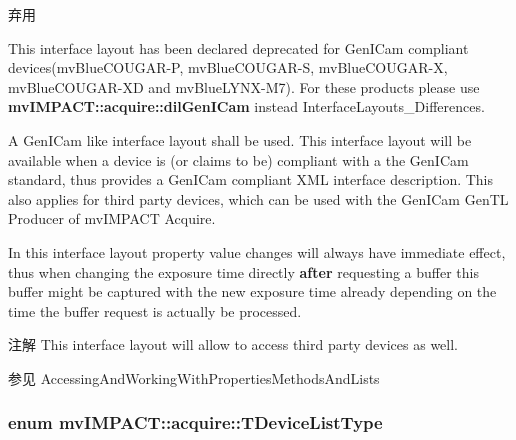 \begin{Desc}
\begin{description}
\begin{DoxyRefDesc}{弃用}
\item[\hyperlink{deprecated__deprecated000004}{弃用}]This interface layout has been declared deprecated for Gen\+I\+Cam compliant devices(mv\+Blue\+C\+O\+U\+G\+A\+R-\/\+P, mv\+Blue\+C\+O\+U\+G\+A\+R-\/\+S, mv\+Blue\+C\+O\+U\+G\+A\+R-\/\+X, mv\+Blue\+C\+O\+U\+G\+A\+R-\/\+X\+D and mv\+Blue\+L\+Y\+N\+X-\/\+M7). For these products please use {\bfseries mv\+I\+M\+P\+A\+C\+T\+::acquire\+::dil\+Gen\+I\+Cam} instead Interface\+Layouts\+\_\+\+Differences. \end{DoxyRefDesc}
\item[{\em 
\hypertarget{group___common_interface_gga8206c9f9a594b7c21b43aaa624a86220ad2eaec878b614e46b3dd5e8cd725f58b}{dil\+Gen\+I\+Cam}\label{group___common_interface_gga8206c9f9a594b7c21b43aaa624a86220ad2eaec878b614e46b3dd5e8cd725f58b}
}]A Gen\+I\+Cam\texttrademark{} like interface layout shall be used. This interface layout will be available when a device is (or claims to be) compliant with a the Gen\+I\+Cam\texttrademark{} standard, thus provides a Gen\+I\+Cam\texttrademark{} compliant X\+M\+L interface description. This also applies for third party devices, which can be used with the Gen\+I\+Cam Gen\+T\+L Producer of mv\+I\+M\+P\+A\+C\+T Acquire.

In this interface layout property value changes will always have immediate effect, thus when changing the exposure time directly {\bfseries after} requesting a buffer this buffer might be captured with the new exposure time already depending on the time the buffer request is actually be processed.

\begin{DoxyNote}{注解}
This interface layout will allow to access third party devices as well.
\end{DoxyNote}
\begin{DoxySeeAlso}{参见}
Accessing\+And\+Working\+With\+Properties\+Methods\+And\+Lists 
\end{DoxySeeAlso}
\end{description}
\end{Desc}
\hypertarget{group___common_interface_ga0dca79bbf0803a4ecec16d6cbb1a3dbb}{
\subsubsection[{T\+Device\+List\+Type}]{\setlength{\rightskip}{0pt plus 5cm}enum {\bf mv\+I\+M\+P\+A\+C\+T\+::acquire\+::\+T\+Device\+List\+Type}}}\label{group___common_interface_ga0dca79bbf0803a4ecec16d6cbb1a3dbb}


